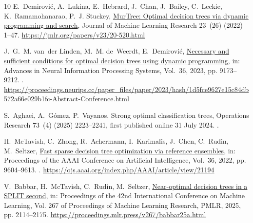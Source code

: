 \documentclass[final,5p,times]{elsarticle}
\begin{document}
\begin{thebibliography}{10}
E.~Demirovi{\'c}, A.~Lukina, E.~Hebrard, J.~Chan, J.~Bailey, C.~Leckie,
  K.~Ramamohanarao, P.~J. Stuckey,
  \href{https://jmlr.org/papers/v23/20-520.html}{{MurTree}: Optimal decision
  trees via dynamic programming and search}, Journal of Machine Learning
  Research 23~(26) (2022) 1--47.
\newline\urlprefix\url{https://jmlr.org/papers/v23/20-520.html}

J.~G.~M. van~der Linden, M.~M. de~Weerdt, E.~Demirovi{\'c},
  \href{https://proceedings.neurips.cc/paper_files/paper/2023/hash/1d5fce9627e15c84db572a66e029b1fc-Abstract-Conference.html}{Necessary
  and sufficient conditions for optimal decision trees using dynamic
  programming}, in: Advances in Neural Information Processing Systems, Vol.~36,
  2023, pp. 9173--9212.
\newblock \href {https://doi.org/10.52202/075280-0404}
  {}.
\newline\urlprefix\url{https://proceedings.neurips.cc/paper_files/paper/2023/hash/1d5fce9627e15c84db572a66e029b1fc-Abstract-Conference.html}

S.~Aghaei, A.~G{\'o}mez, P.~Vayanos, Strong optimal classification trees,
  Operations Research 73~(4) (2025) 2223--2241, first published online
  31 July 2024.
\newblock \href {https://doi.org/10.1287/opre.2021.0034}
  {}.

H.~McTavish, C.~Zhong, R.~Achermann, I.~Karimalis, J.~Chen, C.~Rudin,
  M.~Seltzer,
  \href{https://ojs.aaai.org/index.php/AAAI/article/view/21194}{Fast sparse
  decision tree optimization via reference ensembles}, in: Proceedings of the
  AAAI Conference on Artificial Intelligence, Vol.~36, 2022, pp. 9604--9613.
\newblock \href {https://doi.org/10.1609/aaai.v36i9.21194}
  {}.
\newline\urlprefix\url{https://ojs.aaai.org/index.php/AAAI/article/view/21194}

V.~Babbar, H.~McTavish, C.~Rudin, M.~Seltzer,
  \href{https://proceedings.mlr.press/v267/babbar25a.html}{Near-optimal
  decision trees in a {SPLIT} second}, in: Proceedings of the 42nd
  International Conference on Machine Learning, Vol. 267 of Proceedings of
  Machine Learning Research, PMLR, 2025, pp. 2114--2175.
\newline\urlprefix\url{https://proceedings.mlr.press/v267/babbar25a.html}


\end{thebibliography}
\end{document}
